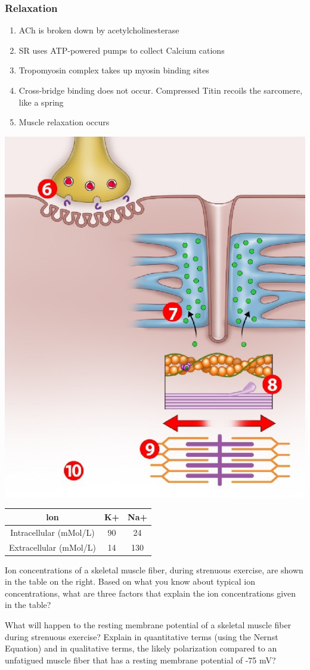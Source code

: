 \documentclass[11pt,fleqn]{book} %
\begin{document}
\subsubsection{Relaxation}
\begin{enumerate}[start=6]
    \item ACh is broken down by
acetylcholinesterase
    \item SR uses ATP-powered pumps
to collect Calcium cations
    \item Tropomyosin complex takes
up myosin binding sites
    \item Cross-bridge binding does not
occur. Compressed Titin recoils
the sarcomere, like a spring
    \item Muscle relaxation occurs
\end{enumerate}

\begin{center}
    \includegraphics[width=0.31\linewidth]{Pictures/Screenshot 2024-04-03 225216.png}
\end{center}

\begin{exercise}
\begin{tabular}{ccc}
\textbf{lon}  & \textbf{K+}  & \textbf{Na+} \\
\hline
Intracellular (mMol/L) &  90  & 24 \\
Extracellular (mMol/L) &  14  & 130 
\end{tabular}

    Ion concentrations of a
skeletal muscle fiber,
during strenuous exercise,
are shown in the table on
the right. Based on what
you know about typical ion
concentrations, what are
three factors that explain
the ion concentrations
given in the table?
\end{exercise}

\begin{exercise}
    What will happen to the
resting membrane
potential of a skeletal
muscle fiber during
strenuous exercise? Explain in quantitative
terms (using the Nernst
Equation) and in qualitative
terms, the likely
polarization compared to
an unfatigued muscle fiber
that has a resting
membrane potential of -75
mV?
\end{exercise}
\end{document}
